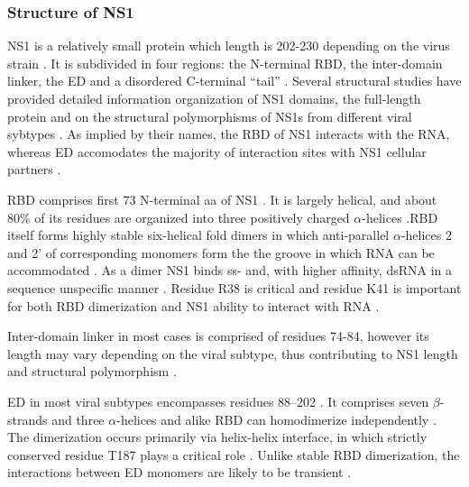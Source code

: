 		
		\subsubsection{Structure of NS1}
		
		\gls{NS1} is a relatively small protein which length is 202-230 depending on the virus strain \parencite{Hale2008b}. It is subdivided in four regions: the N-terminal \gls{RBD}, the inter-domain linker, the \gls{ED} and a disordered C-terminal ``tail'' \parencite{Hale2014}. Several structural studies have provided detailed information organization of \gls{NS1} domains, the full-length protein and on the structural polymorphisms of \gls{NS1}s from different viral sybtypes \parencite{Chien1997, Liu1997a, Wang1999a, Bornholdt2006, Yin2007a, Hale2008c, Cheng2009, Xia2009, Kerry2011, Carrillo2014}. As implied by their names, the \gls{RBD} of NS1 interacts with the RNA, whereas \gls{ED} accomodates the majority of interaction sites with \gls{NS1} cellular partners \parencite{Hale2008b}.
		
		\gls{RBD} comprises first 73 N-terminal aa of \gls{NS1} \parencite{Qian1995a, Yin2007a}. It is largely helical, and about 80\% of its residues are organized into three positively charged $\alpha$-helices \parencite{Qian1995a, Liu1997a}.\gls{RBD} itself forms highly stable six-helical fold dimers in which anti-parallel $\alpha$-helices 2 and 2' of corresponding monomers form the the groove in which RNA can be accommodated \parencite{Chien1997, Wang1999a}. As a dimer NS1 binds ss- and, with higher affinity, dsRNA in a sequence unspecific manner \parencite{Hatada1992, Chien1997, Qian1995}. Residue R38 is critical and residue K41 is important for both \gls{RBD} dimerization and \gls{NS1} ability to interact with RNA \parencite{Hatada1992, Wang1999a}.
		
		Inter-domain linker in most cases is comprised of residues 74-84, however its length may vary depending on the viral subtype, thus contributing to \gls{NS1} length and structural polymorphism \parencite{Bornholdt2006, Carrillo2014, Kerry2011}.
		
		\gls{ED} in most viral subtypes encompasses residues 88--202 \parencite{Hale2014}. It comprises seven $\beta$-strands and three $\alpha$-helices and alike \gls{RBD} can homodimerize independently \parencite{Bornholdt2006, Hale2008c, Xia2009}. The dimerization occurs primarily via helix-helix interface, in which strictly conserved residue T187 plays a critical role \parencite{Hale2008c, Kerry2011}. Unlike stable \gls{RBD} dimerization, the interactions between \gls{ED} monomers are likely to be transient \parencite{Kerry2011, Hale2014}.
		
